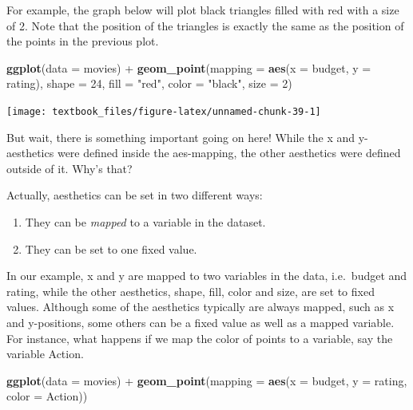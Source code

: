 \documentclass[]{tufte-book}
\newenvironment{Shaded}{}{}
\newcommand{\DataTypeTok}[1]{\textcolor[rgb]{0.56,0.13,0.00}{#1}}
\newcommand{\DecValTok}[1]{\textcolor[rgb]{0.25,0.63,0.44}{#1}}
\newcommand{\KeywordTok}[1]{\textcolor[rgb]{0.00,0.44,0.13}{\textbf{#1}}}
\newcommand{\NormalTok}[1]{#1}
\newcommand{\OperatorTok}[1]{\textcolor[rgb]{0.40,0.40,0.40}{#1}}
\newcommand{\StringTok}[1]{\textcolor[rgb]{0.25,0.44,0.63}{#1}}
\providecommand{\tightlist}{%
  \setlength{\itemsep}{0pt}\setlength{\parskip}{0pt}}
\begin{document}
For example, the graph below will plot black triangles filled with red with a size of 2. Note that the position of the triangles is exactly the same as the position of the points in the previous plot.

\begin{Shaded}
\begin{Highlighting}[]
\KeywordTok{ggplot}\NormalTok{(}\DataTypeTok{data =}\NormalTok{ movies) }\OperatorTok{+}
\StringTok{    }\KeywordTok{geom_point}\NormalTok{(}\DataTypeTok{mapping =} \KeywordTok{aes}\NormalTok{(}\DataTypeTok{x =}\NormalTok{ budget, }\DataTypeTok{y =}\NormalTok{ rating), }
               \DataTypeTok{shape =} \DecValTok{24}\NormalTok{, }
               \DataTypeTok{fill =} \StringTok{"red"}\NormalTok{, }
               \DataTypeTok{color =} \StringTok{"black"}\NormalTok{, }
               \DataTypeTok{size =} \DecValTok{2}\NormalTok{)}
\end{Highlighting}
\end{Shaded}

\texttt{[image: textbook\_files/figure-latex/unnamed-chunk-39-1]}

But wait, there is something important going on here! While the x and y-aesthetics were defined inside the aes-mapping, the other aesthetics were defined outside of it. Why's that?

Actually, aesthetics can be set in two different ways:

\begin{enumerate}
\def\labelenumi{\arabic{enumi}.}
\tightlist
\item
  They can be \emph{mapped} to a variable in the dataset.
\item
  They can be set to one fixed value.
\end{enumerate}

In our example, x and y are mapped to two variables in the data, i.e.~budget and rating, while the other aesthetics, shape, fill, color and size, are set to fixed values. Although some of the aesthetics typically are always mapped, such as x and y-positions, some others can be a fixed value as well as a mapped variable. For instance, what happens if we map the color of points to a variable, say the variable Action.

\begin{Shaded}
\begin{Highlighting}[]
\KeywordTok{ggplot}\NormalTok{(}\DataTypeTok{data =}\NormalTok{ movies) }\OperatorTok{+}
\StringTok{    }\KeywordTok{geom_point}\NormalTok{(}\DataTypeTok{mapping =} \KeywordTok{aes}\NormalTok{(}\DataTypeTok{x =}\NormalTok{ budget, }
                             \DataTypeTok{y =}\NormalTok{ rating, }
                             \DataTypeTok{color =}\NormalTok{ Action))}
\end{Highlighting}
\end{Shaded}
\end{document}
